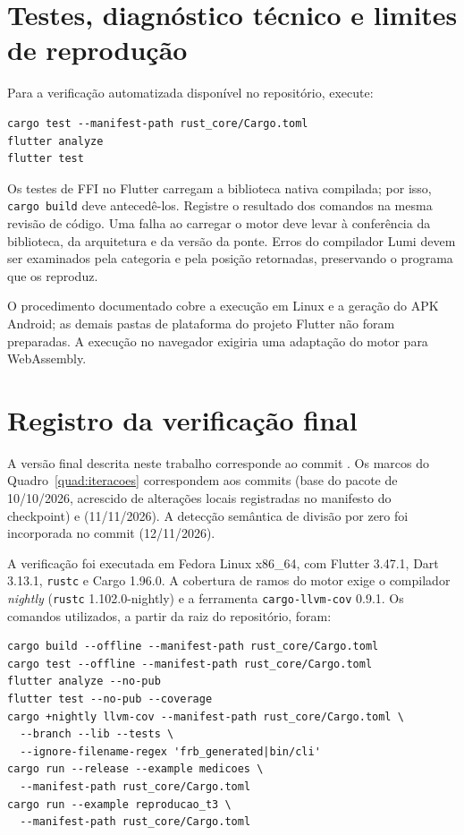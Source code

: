 \section*{Testes, diagnóstico técnico e limites de reprodução}

Para a verificação automatizada disponível no repositório, execute:

\begin{lstlisting}[language={},numbers=none]
cargo test --manifest-path rust_core/Cargo.toml
flutter analyze
flutter test
\end{lstlisting}

Os testes de FFI no Flutter carregam a biblioteca nativa compilada; por isso,
\texttt{cargo build} deve antecedê-los. Registre o resultado dos comandos na
mesma revisão de código. Uma falha ao carregar o motor deve levar à conferência
da biblioteca, da arquitetura e da versão da ponte. Erros do compilador Lumi
devem ser examinados pela categoria e pela posição retornadas, preservando o
programa que os reproduz.

O procedimento documentado cobre a execução em Linux e a geração do APK Android; as demais pastas de plataforma do projeto Flutter não foram preparadas. A execução no navegador exigiria uma adaptação do motor para WebAssembly. 

\section*{Registro da verificação final}

A versão final descrita neste trabalho corresponde ao commit
. Os marcos do
Quadro~\ref{quad:iteracoes} correspondem aos commits
 (base do pacote de 10/10/2026,
acrescido de alterações locais registradas no manifesto do checkpoint) e
 (11/11/2026). A detecção semântica
de divisão por zero foi incorporada no commit
 (12/11/2026).

A verificação foi executada em Fedora Linux x86\_64, com Flutter 3.47.1, Dart
3.13.1, \texttt{rustc} e Cargo 1.96.0. A cobertura de ramos do motor exige o
compilador \textit{nightly} (\texttt{rustc} 1.102.0-nightly) e a ferramenta
\texttt{cargo-llvm-cov} 0.9.1. Os comandos utilizados, a partir da raiz do
repositório, foram:

\begin{lstlisting}[language={},numbers=none]
cargo build --offline --manifest-path rust_core/Cargo.toml
cargo test --offline --manifest-path rust_core/Cargo.toml
flutter analyze --no-pub
flutter test --no-pub --coverage
cargo +nightly llvm-cov --manifest-path rust_core/Cargo.toml \
  --branch --lib --tests \
  --ignore-filename-regex 'frb_generated|bin/cli'
cargo run --release --example medicoes \
  --manifest-path rust_core/Cargo.toml
cargo run --example reproducao_t3 \
  --manifest-path rust_core/Cargo.toml
\end{lstlisting}

